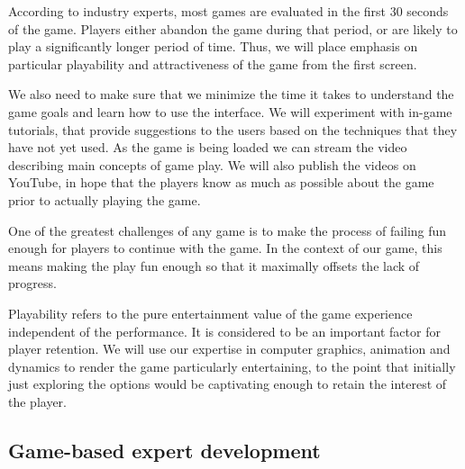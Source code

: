 \documentclass[preprint]{sig-alternate}
\let\Description =\description
\def\Nospacing{\itemsep=0pt\topsep=0pt\partopsep=0pt\parskip=0pt\parsep=0pt}
\renewenvironment{description}{\Description\Nospacing}{\endlist}
\begin{document}
\begin{description}
\item[Focus on the first 30 seconds.] According to industry experts,
  most games are evaluated in the first 30 seconds of the
  game. Players either abandon the game during that period, or are
  likely to play a significantly longer period of time. Thus, we will
  place emphasis on particular playability and attractiveness of the
  game from the first screen.

\item[Minimize startup curve.] We also need to make sure that we
  minimize the time it takes to understand the game goals and learn
  how to use the interface. We will experiment with in-game tutorials,
  that provide suggestions to the users based on the techniques that
  they have not yet used.  As the game is being loaded we can stream
  the video describing main concepts of game play. We will also
  publish the videos on YouTube, in hope that the players know as much
  as possible about the game prior to actually playing the game.

\item[Making failing fun.] One of the greatest challenges of any game
  is to make the process of failing fun enough for players to continue
  with the game. In the context of our game, this means making the
  play fun enough so that it maximally offsets the lack of progress.

\item[Playability.] Playability refers to the pure entertainment value
  of the game experience independent of the performance. It is
  considered to be an important factor for player retention. We will
  use our expertise in computer graphics, animation and dynamics to
  render the game particularly entertaining, to the point that
  initially just exploring the options would be captivating enough to
  retain the interest of the player.
\end{description}


\subsection{Game-based expert development}
\label{sec:expert-development}
\end{document}
